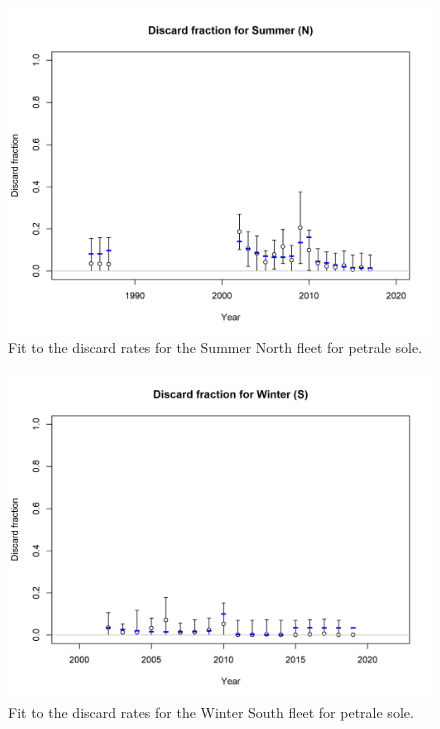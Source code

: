 \documentclass[12pt,]{article}
\begin{document}
\FloatBarrier

\begin{figure}
\centering
\includegraphics{r4ss/plots_mod1/discard_dataSummer (N).png}
\caption{Fit to the discard rates for the Summer North fleet for petrale
sole. \label{fig:fit_sn_discard}}
\end{figure}

\FloatBarrier

\begin{figure}
\centering
\includegraphics{r4ss/plots_mod1/discard_dataWinter (S).png}
\caption{Fit to the discard rates for the Winter South fleet for petrale
sole. \label{fig:fit_ws_discard}}
\end{figure}
\end{document}
